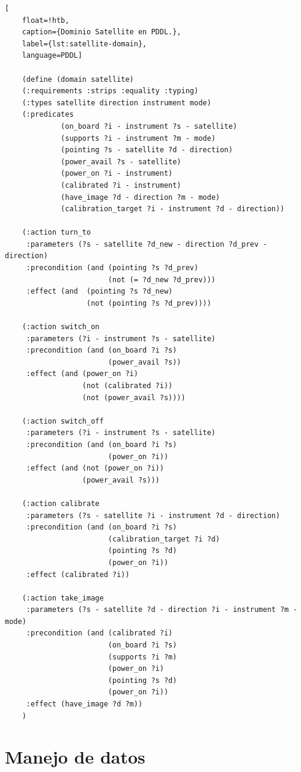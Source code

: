 \begin{lstlisting}[
    float=!htb,
    caption={Dominio Satellite en PDDL.},
    label={lst:satellite-domain},
    language=PDDL]

    (define (domain satellite)
    (:requirements :strips :equality :typing)
    (:types satellite direction instrument mode)
    (:predicates 
             (on_board ?i - instrument ?s - satellite)
             (supports ?i - instrument ?m - mode)
             (pointing ?s - satellite ?d - direction)
             (power_avail ?s - satellite)
             (power_on ?i - instrument)
             (calibrated ?i - instrument)
             (have_image ?d - direction ?m - mode)
             (calibration_target ?i - instrument ?d - direction))
  
    (:action turn_to
     :parameters (?s - satellite ?d_new - direction ?d_prev - direction)
     :precondition (and (pointing ?s ?d_prev)
                        (not (= ?d_new ?d_prev)))
     :effect (and  (pointing ?s ?d_new)
                   (not (pointing ?s ?d_prev))))
   
    (:action switch_on
     :parameters (?i - instrument ?s - satellite)
     :precondition (and (on_board ?i ?s) 
                        (power_avail ?s))
     :effect (and (power_on ?i)
                  (not (calibrated ?i))
                  (not (power_avail ?s))))
   
    (:action switch_off
     :parameters (?i - instrument ?s - satellite)
     :precondition (and (on_board ?i ?s)
                        (power_on ?i))
     :effect (and (not (power_on ?i))
                  (power_avail ?s)))
  
    (:action calibrate
     :parameters (?s - satellite ?i - instrument ?d - direction)
     :precondition (and (on_board ?i ?s)
                        (calibration_target ?i ?d)
                        (pointing ?s ?d)
                        (power_on ?i))
     :effect (calibrated ?i))

    (:action take_image
     :parameters (?s - satellite ?d - direction ?i - instrument ?m - mode)
     :precondition (and (calibrated ?i)
                        (on_board ?i ?s)
                        (supports ?i ?m)
                        (power_on ?i)
                        (pointing ?s ?d)
                        (power_on ?i))
     :effect (have_image ?d ?m))
    )
\end{lstlisting}

\section{Manejo de datos}

